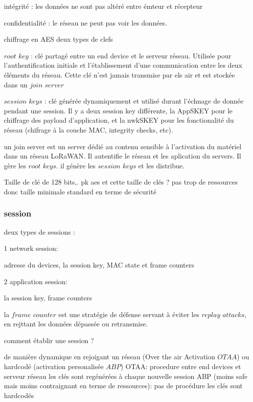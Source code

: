 \documentclass[12pt,a4paper,oneside, titlepage]{report}
\begin{document}
intégrité : les données ne sont pas altéré entre émteur et récepteur

confidentialité : le réseau ne peut pas voir les données.

chiffrage en AES
deux types de clefs

$root$ $key$ : clé partagé entre un end device et le serveur réseau. Utilisée pour l'authentification initiale et l'établissement d'une communication entre les deux éléments du réseau. Cette clé n'est jamais transmise par els air et est stockée dans un $join$ $server$

$session$ $keys$ : clé générée dynamiquement et utilisé durant l'échnage de donnée pendant une session. Il y a deux session key différente, la AppSKEY pour le chiffrage des payload d'application, et la nwkSKEY pour les fonctionalité du réseau (chifrage à la couche MAC, integrity checks, etc).

un join server est un server dédié au contenu sensible à l'activation du matériel dans un réseau LoRaWAN. Il autentifie le réseau et les aplication du servers. Il gère les $root$ $keys$. il génère les $session$ $keys$ et les distribue.

Taille de clé de 128 bits,.
pk aes et cette taille de clés ? pas trop de ressources donc taille minimale standard en terme de sécurité

\subsubsection{session}

deux types de sessions :

1 network session:

adresse du devices, la session key, MAC state et frame counters

2 application session:

la session key, frame counters

la $frame$ $counter$ est une stratégie de défense servant à éviter les $replay$ $attacks$, en rejttant les données dépassée ou retransmise. 


comment établir une session ?

de manière dynamique en rejoigant un réseau (Over the air Activation $OTAA$) ou hardcodé (activation personalisée $ABP$)
OTAA:
procedure entre end devices et serveur réseau
les clés sont regénérées à chaque nouvelle session
ABP (moins safe mais moins contraignant en terme de ressources):
pas de procédure
les clés sont hardcodés
\end{document}
